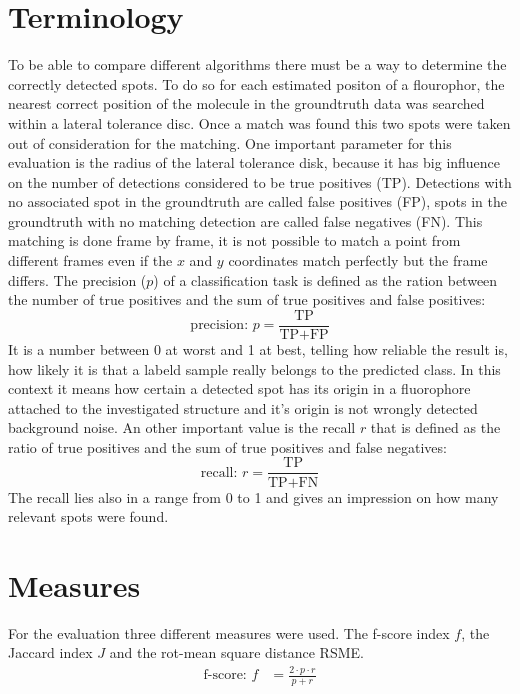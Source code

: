 \section{Terminology}
To be able to compare different algorithms there must be a way to determine the correctly detected spots. To do so for each estimated positon of a flourophor, the nearest correct position of the molecule in the groundtruth data was searched within a lateral tolerance disc. Once a match was found this two spots were taken out of consideration for the matching.\newline
One important parameter for this evaluation is the radius of the lateral tolerance disk, because it has big influence on the number of detections considered to be true positives (TP).\newline
Detections with no associated spot in the groundtruth are called false positives (FP), spots in the groundtruth with no matching detection are called false negatives (FN).\newline
This matching is done frame by frame, it is not possible to match a point from different frames even if the $x$ and $y$ coordinates match perfectly but the frame differs.\newline
The precision ($p$) of a classification task is defined as the ration between the number of true positives and the sum of true positives and false positives:
\begin{equation}
\text{precision: }p = \frac{\text{TP}}{\text{TP}+\text{FP}} 
\end{equation}
It is a number between 0 at worst and 1 at best, telling how reliable the result is, how likely it is that a labeld sample really belongs to the predicted class. In this context it means how certain a detected spot has its origin in a fluorophore attached to the investigated structure and it's origin is not wrongly detected background noise.\newline
An other important value is the recall $r$ that is defined as the ratio of true positives and the sum of true positives and false negatives:
\begin{equation}
\text{recall: }r = \frac{\text{TP}}{\text{TP}+\text{FN}}
\end{equation}
The recall lies also in a range from 0 to 1  and gives an impression on how many relevant spots were found.

\section{Measures} 
For the evaluation three different measures were used. The f-score index $f$, the Jaccard index $J$ and the rot-mean square distance RSME. 
\begin{eqnarray}
	\text{f-score: }f &=\frac{2\cdot p \cdot r}{p+r} 
\end{eqnarray}

